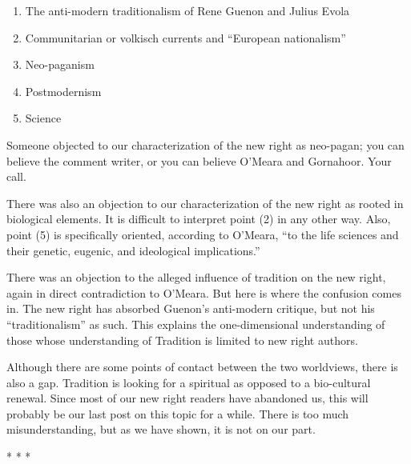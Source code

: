 \begin{enumerate}


\item The anti-modern traditionalism of Rene Guenon and Julius Evola

\item Communitarian or volkisch currents and ``European nationalism''

\item Neo-paganism

\item Postmodernism

\item Science
\end{enumerate}


Someone objected to our characterization of the new right as neo-pagan; you can believe the comment writer, or you can believe O'Meara and Gornahoor. Your call.

There was also an objection to our characterization of the new right as rooted in biological elements. It is difficult to interpret point (2) in any other way. Also, point (5) is specifically oriented, according to O'Meara, ``to the life sciences and their genetic, eugenic, and ideological implications.''

There was an objection to the alleged influence of tradition on the new right, again in direct contradiction to O'Meara. But here is where the confusion comes in. The new right has absorbed Guenon's anti-modern critique, but not his ``traditionalism'' as such. This explains the one-dimensional understanding of those whose understanding of Tradition is limited to new right authors.

Although there are some points of contact between the two worldviews, there is also a gap. Tradition is looking for a spiritual as opposed to a bio-cultural renewal. Since most of our new right readers have abandoned us, this will probably be our last post on this topic for a while. There is too much misunderstanding, but as we have shown, it is not on our part.



\begin{center}* * *\end{center}

